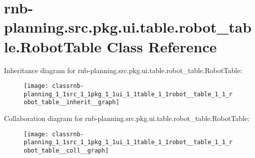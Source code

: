 \hypertarget{classrnb-planning_1_1src_1_1pkg_1_1ui_1_1table_1_1robot__table_1_1_robot_table}{}\section{rnb-\/planning.src.\+pkg.\+ui.\+table.\+robot\+\_\+table.\+Robot\+Table Class Reference}
\label{classrnb-planning_1_1src_1_1pkg_1_1ui_1_1table_1_1robot__table_1_1_robot_table}


Inheritance diagram for rnb-\/planning.src.\+pkg.\+ui.\+table.\+robot\+\_\+table.\+Robot\+Table\+:
\nopagebreak
\begin{figure}[H]
\begin{center}
\leavevmode
\texttt{[image: classrnb-planning\_1\_1src\_1\_1pkg\_1\_1ui\_1\_1table\_1\_1robot\_\_table\_1\_1\_robot\_table\_\_inherit\_\_graph]}
\end{center}
\end{figure}


Collaboration diagram for rnb-\/planning.src.\+pkg.\+ui.\+table.\+robot\+\_\+table.\+Robot\+Table\+:
\nopagebreak
\begin{figure}[H]
\begin{center}
\leavevmode
\texttt{[image: classrnb-planning\_1\_1src\_1\_1pkg\_1\_1ui\_1\_1table\_1\_1robot\_\_table\_1\_1\_robot\_table\_\_coll\_\_graph]}
\end{center}
\end{figure}
